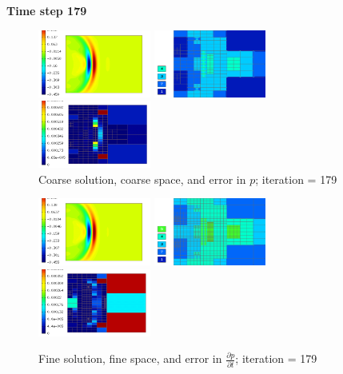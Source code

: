 \textbf{Time step 179}
\begin{figure}[H]
		\includegraphics[width=0.33\textwidth]{img/acoustics/Solution_179.png}\hspace{1mm}
		\includegraphics[width=0.33\textwidth]{img/acoustics/Space_179.png}\hspace{1mm}
		\includegraphics[width=0.33\textwidth]{img/acoustics/ErrorValue_179.png}\\
		\caption{Coarse solution, coarse space, and error in $p$; iteration = 179}
\vspace{5mm}
		\includegraphics[width=0.33\textwidth]{img/acoustics/RefSolution_179.png}\hspace{1mm}
		\includegraphics[width=0.33\textwidth]{img/acoustics/RefSpace_179.png}\hspace{1mm}
		\includegraphics[width=0.33\textwidth]{img/acoustics/ErrorDerivative_179.png}\\
		\caption{Fine solution, fine space, and error in $\frac{\partial p}{\partial t}$; iteration = 179}
	\end{figure}